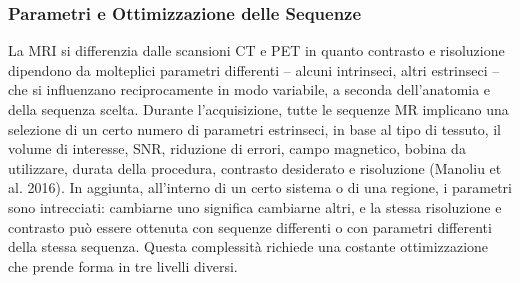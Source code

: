 \documentclass[leqno,10pt,twocolumn,a4paper]{article}
\begin{document}
	\subsubsection{Parametri e Ottimizzazione delle Sequenze}
	La MRI si differenzia dalle scansioni CT e PET in quanto contrasto e risoluzione dipendono da molteplici parametri differenti -- alcuni intrinseci, altri estrinseci -- che si influenzano reciprocamente
	in modo variabile, a seconda dell'anatomia e della sequenza scelta. Durante l'acquisizione, tutte le sequenze MR implicano una selezione di un certo numero di parametri estrinseci, in base al tipo 
	di tessuto, il volume di interesse, SNR, riduzione di errori, campo magnetico, bobina da utilizzare, durata della procedura, contrasto desiderato e risoluzione (Manoliu et al. 2016). In aggiunta,
	all'interno di un certo sistema o di una regione, i parametri sono intrecciati: cambiarne uno significa cambiarne altri, e la stessa risoluzione e contrasto può essere ottenuta con sequenze differenti
	o con parametri differenti della stessa sequenza. Questa complessità richiede una costante ottimizzazione che prende forma in tre livelli diversi.
	
	
	
	
\end{document}
